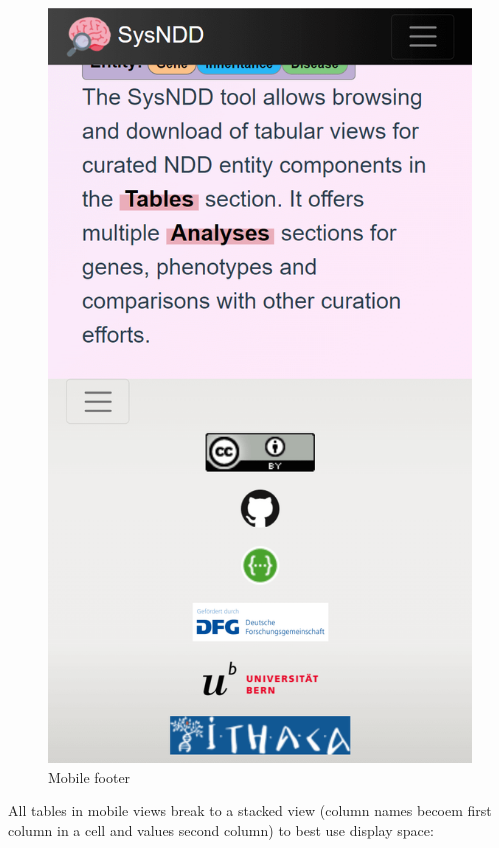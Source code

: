 \documentclass[
]{article}
\begin{document}
\begin{figure}
\centering
\includegraphics{./static/img/02_21-mobile-footer.png}
\caption{Mobile footer}
\end{figure}

All tables in mobile views break to a stacked view (column names becoem first column in a cell and values second column) to best use display space:
\end{document}
